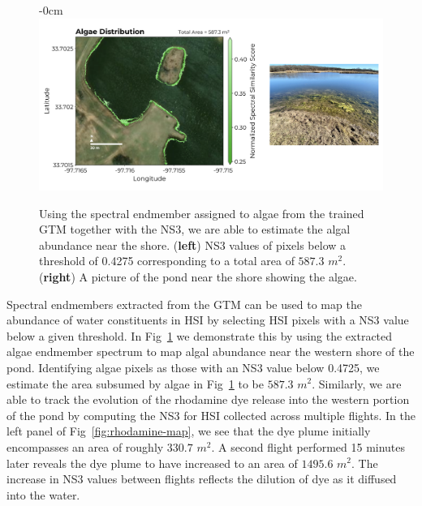 \documentclass[remotesensing,article,submit,pdftex,moreauthors]{Definitions/mdpi}
\begin{document}
\begin{figure}[t]
\begin{adjustwidth}{-\extralength}{0cm}
\centering
\includegraphics[width=17.0cm]{paper/figures/results/algae.png}
\end{adjustwidth}
\caption{Using the spectral endmember assigned to algae from the trained GTM together with the NS3, we are able to estimate the algal abundance near the shore. (\textbf{left}) NS3 values of pixels below a threshold of 0.4275 corresponding to a total area of $587.3$ $m^2$. (\textbf{right}) A picture of the pond near the shore showing the algae.\label{fig:algae-map}}
\end{figure}  

Spectral endmembers extracted from the GTM can be used to map the abundance of water constituents in HSI by selecting HSI pixels with a NS3 value below a given threshold. In Fig~\ref{fig:algae-map} we demonstrate this by using the extracted algae endmember spectrum to map algal abundance near the western shore of the pond. Identifying algae pixels as those with an NS3 value below 0.4725, we estimate the area subsumed by algae in Fig~\ref{fig:algae-map} to be $587.3$ $m^2$. Similarly, we are able to track the evolution of the rhodamine dye release into the western portion of the pond by computing the NS3 for HSI collected across multiple flights. In the left panel of Fig~\ref{fig:rhodamine-map}, we see that the dye plume initially encompasses an area of roughly $330.7$ $m^2$. A second flight performed 15 minutes later reveals the dye plume to have increased to an area of $1495.6$ $m^2$. The increase in NS3 values between flights reflects the dilution of dye as it diffused into the water.
\end{document}
